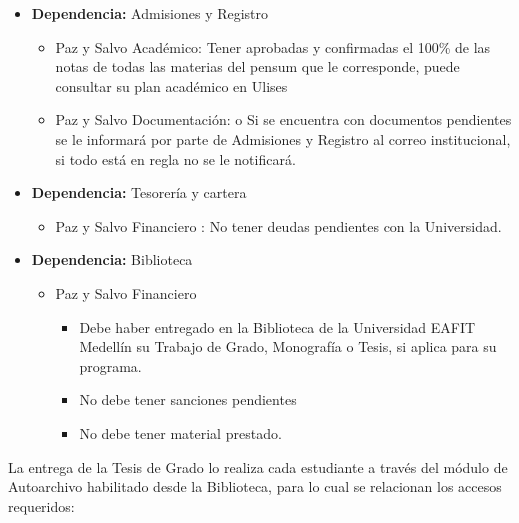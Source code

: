 \begin{itemize}
    \item \textbf{Dependencia:} Admisiones y Registro
        \begin{itemize}
            \item Paz y Salvo Académico: Tener aprobadas y confirmadas el 100\% de las notas de todas las materias del pensum que le corresponde, puede consultar su plan académico en Ulises
            \item Paz y Salvo Documentación: o	Si se encuentra con documentos pendientes se le informará por parte de Admisiones y Registro al correo institucional, si todo está en regla no se le notificará.
        \end{itemize}
        
    \item \textbf{Dependencia:} Tesorería y cartera
            \begin{itemize}
            \item Paz y Salvo Financiero : No tener deudas pendientes con la Universidad.
        \end{itemize}
        
    \item \textbf{Dependencia:} Biblioteca 
            \begin{itemize}
            \item Paz y Salvo Financiero
             \begin{itemize}
                 \item Debe haber entregado en la Biblioteca de la Universidad EAFIT Medellín su Trabajo de Grado, Monografía o Tesis, si aplica para su programa. 
                 \item No debe tener sanciones pendientes
                 \item No debe tener material prestado.
             \end{itemize}
        \end{itemize}
        
\end{itemize}

La entrega de la Tesis de Grado lo realiza cada estudiante a través del módulo de Autoarchivo habilitado desde la Biblioteca, para lo cual se relacionan los accesos requeridos:

